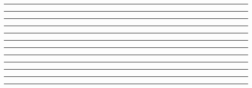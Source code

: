 \vspace*{0.3cm}
\rule{\textwidth}{0.0mm}
\vspace*{0.65cm}
\rule{\textwidth}{0.4mm}
\vspace*{0.65cm}
\rule{\textwidth}{0.4mm}
\vspace*{0.65cm}
\rule{\textwidth}{0.4mm}
\vspace*{0.65cm}
\rule{\textwidth}{0.4mm}
\vspace*{0.65cm}
\rule{\textwidth}{0.4mm}
\vspace*{0.65cm}
\rule{\textwidth}{0.4mm}
\vspace*{0.65cm}
\rule{\textwidth}{0.4mm}
\vspace*{0.65cm}
\rule{\textwidth}{0.4mm}
\vspace*{0.65cm}
\rule{\textwidth}{0.4mm}
\vspace*{0.65cm}
\rule{\textwidth}{0.4mm}
\vspace*{0.65cm}
\rule{\textwidth}{0.4mm}

\newpage
\resetBackground